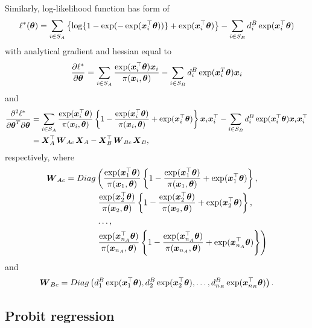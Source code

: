 \documentclass[
  letterpaper,
  DIV=11,
  numbers=noendperiod]{scrreprt}
\begin{document}
Similarly, log-likelihood function has form of \[
\ell^{*}(\boldsymbol{\theta}) = \sum_{i \in S_{A}}\left\{\log\{1 - \exp(-\exp(\boldsymbol{x}_{i}^{\top}\boldsymbol{\theta}))\} + \exp(\boldsymbol{x}_{i}^{\top}\boldsymbol{\theta})\right\} - \sum_{i \in S_{B}} d_{i}^{B}\exp(\boldsymbol{x}_{i}^{\top}\boldsymbol{\theta})
\] with analytical gradient and hessian equal to \[
    \frac{\partial \ell^*}{\partial\boldsymbol{\theta}} = \sum_{i \in S_{A}}\frac{\exp(\boldsymbol{x}_{i}^{\top}\boldsymbol{\theta})\boldsymbol{x}_{i}}{\pi(\boldsymbol{x}_{i}, \boldsymbol{\theta})} - \sum_{i \in S_{B}}d_{i}^{B}\exp(\boldsymbol{x}_{i}^{T}\boldsymbol{\theta})\boldsymbol{x}_{i}
\] and \[
    \begin{split}
    \frac{\partial^{2} \ell^{*}}{\partial\boldsymbol{\theta}^{T} \partial\boldsymbol{\theta}} & = \sum_{i \in S_A} \frac{\exp(\boldsymbol{x}_{i}^{\top}\boldsymbol{\theta})}{\pi(\boldsymbol{x}_{i}, \boldsymbol{\theta})} \left\{1 - \frac{\exp(\boldsymbol{x}_{i}^{\top}\boldsymbol{\theta})}{\pi(\boldsymbol{x}_{i}, \boldsymbol{\theta})} + \exp(\boldsymbol{x}_{i}^{\top}\boldsymbol{\theta})\right\}\boldsymbol{x}_i\boldsymbol{x}_i^{\top} - \sum_{i \in S_B}d_i^B\exp (\boldsymbol{x}_{i}^{\top}\boldsymbol{\theta})\boldsymbol{x}_i\boldsymbol{x}_i^{\top} \\ & = \boldsymbol{X}_A^{\top}\operatorname{\boldsymbol{W}}_{Ac}\boldsymbol{X}_A - \boldsymbol{X}_B^{\top}\operatorname{\boldsymbol{W}}_{Bc}\boldsymbol{X}_B,
    \end{split}
\] respectively, where \[
\begin{align*}
    \operatorname{\boldsymbol{W}}_{Ac} =  Diag & \left(\frac{\exp(\boldsymbol{x}_{1}^{\top}\boldsymbol{\theta})}{\pi(\boldsymbol{x}_{1}, \boldsymbol{\theta})} \left\{1 - \frac{\exp(\boldsymbol{x}_{1}^{\top}\boldsymbol{\theta})}{\pi(\boldsymbol{x}_{1}, \boldsymbol{\theta})} + \exp(\boldsymbol{x}_{1}^{\top}\boldsymbol{\theta})\right\}, \right.
    \\
    & \left. \frac{\exp(\boldsymbol{x}_{2}^{\top}\boldsymbol{\theta})}{\pi(\boldsymbol{x}_{2}, \boldsymbol{\theta})} \left\{1 - \frac{\exp(\boldsymbol{x}_{2}^{\top}\boldsymbol{\theta})}{\pi(\boldsymbol{x}_{2}, \boldsymbol{\theta})} + \exp(\boldsymbol{x}_{2}^{\top}\boldsymbol{\theta})\right\}, \right.
    \\
    & \left. \ldots, \right.
    \\ 
    & \left. \frac{\exp(\boldsymbol{x}_{n_A}^{\top}\boldsymbol{\theta})} {\pi(\boldsymbol{x}_{n_A}, \boldsymbol{\theta})} \left\{1 - \frac{\exp(\boldsymbol{x}_{n_A}^{\top}\boldsymbol{\theta})}{\pi(\boldsymbol{x}_{n_A}, \boldsymbol{\theta})} + \exp(\boldsymbol{x}_{n_A}^{\top}\boldsymbol{\theta})\right\} \right)
\end{align*}
\] and \[
\begin{align*}
    \operatorname{\boldsymbol{W}}_{Bc} = Diag \left(d_1^B\exp (\boldsymbol{x}_{1}^{\top}\boldsymbol{\theta}), d_2^B\exp (\boldsymbol{x}_{2}^{\top}\boldsymbol{\theta}), \ldots, d_{n_B}^B\exp (\boldsymbol{x}_{n_{B}}^{\top}\boldsymbol{\theta})\right).
\end{align*}
\]

\hypertarget{probit-regression}{%
\subsection{Probit regression}\label{probit-regression}}
\end{document}
